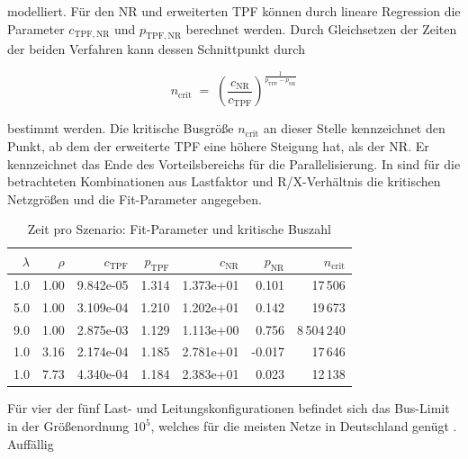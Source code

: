 modelliert.
Für den NR und erweiterten TPF können durch lineare Regression die Parameter $c_\mathrm{TPF, NR}$ und $p_\mathrm{TPF, NR}$ berechnet werden. 
Durch Gleichsetzen der Zeiten der beiden Verfahren kann dessen Schnittpunkt durch

\begin{equation}
	n_\mathrm{crit} \;=\; \left(\frac{c_\mathrm{NR}}{c_\mathrm{TPF}}\right)^{\frac{1}{p_\mathrm{TPF}-p_\mathrm{NR}}}
	\label{eq:fit}
\end{equation}


bestimmt werden. 
Die kritische Busgröße $n_\mathrm{crit}$ an dieser Stelle kennzeichnet den Punkt, ab dem der erweiterte TPF eine höhere Steigung hat, als der NR.
Er kennzeichnet das Ende des Vorteilsbereichs für die Parallelisierung.
In  sind für die betrachteten Kombinationen aus Lastfaktor und R/X-Verhältnis die kritischen Netzgrößen und die Fit-Parameter angegeben. 


\begin{table}[htbp]
	\caption{Zeit pro Szenario: Fit-Parameter und kritische Buszahl}
	\centering
	\begin{tabular}{r|r|r|r|r|r|r}
		\toprule
		$\lambda$ & $\rho$ & $c_{\mathrm{TPF}}$ & $p_{\mathrm{TPF}}$ & $c_{\mathrm{NR}}$ & $p_{\mathrm{NR}}$ & $n_{\mathrm{crit}}$ \\
		\midrule
		1.0 & 1.00 & 9.842e-05 & 1.314 & 1.373e+01 & 0.101 & 17\,506\\
		5.0 & 1.00 & 3.109e-04 & 1.210 & 1.202e+01 & 0.142 & 19\,673\\
		9.0 & 1.00 & 2.875e-03 & 1.129 & 1.113e+00 & 0.756 & 8\,504\,240\\
		\midrule
		1.0 & 3.16 & 2.174e-04 & 1.185 & 2.781e+01 & -0.017 & 17\,646\\
		1.0 & 7.73 & 4.340e-04 & 1.184 & 2.383e+01 & 0.023 & 12\,138\\
		\bottomrule
	\end{tabular}
	
	\label{tab:time_scaling_fits}
\end{table}

Für vier der fünf Last- und Leitungskonfigurationen befindet sich das Bus-Limit in der Größenordnung $10^5$, welches für die meisten Netze in Deutschland genügt \cite{}.
Auffällig  







